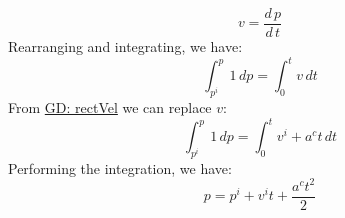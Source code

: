 \documentclass[12pt]{article}
\begin{document}
\begin{displaymath}
v=\frac{d\,p}{d\,t}
\end{displaymath}
Rearranging and integrating, we have:
\begin{displaymath}
\int_{{p^{i}}}^{p}{1}\,dp=\int_{0}^{t}{v}\,dt
\end{displaymath}
From \hyperref[GD:rectVel]{GD: rectVel} we can replace $v$:
\begin{displaymath}
\int_{{p^{i}}}^{p}{1}\,dp=\int_{0}^{t}{{v^{i}}+{a^{c}} t}\,dt
\end{displaymath}
Performing the integration, we have:
\begin{displaymath}
p={p^{i}}+{v^{i}} t+\frac{{a^{c}} t^{2}}{2}
\end{displaymath}
\par~
\end{document}
